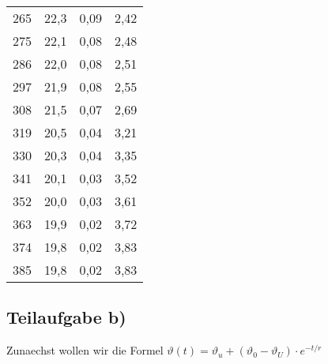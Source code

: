 \documentclass{article}
\begin{document}
\begin{tabular}{llll}
	265            & 22,3                         & 0,09                                                                 & 2,42     \\
	275            & 22,1                         & 0,08                                                                 & 2,48     \\
	286            & 22,0                         & 0,08                                                                 & 2,51     \\
	297            & 21,9                         & 0,08                                                                 & 2,55     \\
	308            & 21,5                         & 0,07                                                                 & 2,69     \\
	319            & 20,5                         & 0,04                                                                 & 3,21     \\
	330            & 20,3                         & 0,04                                                                 & 3,35     \\
	341            & 20,1                         & 0,03                                                                 & 3,52     \\
	352            & 20,0                         & 0,03                                                                 & 3,61     \\
	363            & 19,9                         & 0,02                                                                 & 3,72     \\
	374            & 19,8                         & 0,02                                                                 & 3,83     \\
	385            & 19,8                         & 0,02                                                                 & 3,83     \\
\end{tabular}

\subsection*{Teilaufgabe b)}
Zunaechst wollen wir die Formel $\vartheta (t) = \vartheta_u + (\vartheta_0 - \vartheta_U) \cdot e^{-t/r}$
\end{document}
